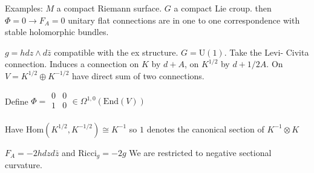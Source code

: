 Examples: 
$ M $ a compact Riemann surface. 
$ G$ a compact Lie croup. 
then $ \Phi = 0 \rightarrow F_A = 0 $ unitary flat connections are in one to one correspondence with stable holomorphic bundles. 

$ g = h dz \wedge d \bar{z} $ compatible with the ex structure. 
$ G = \mathrm{U} ( 1) $. 
Take the Levi- Civita connection. 
Induces a connection on $K$ by $ d + A $, 
on $ K^{1/2} $ by $ d + 1/2 A $. 
On $ V = K^{1/2} \oplus K^{-1/2} $ have direct sum of two connections. 

Define $ \Phi = \begin{array}{rr}
    0 & 0 \\
    1 & 0 \\
\end{array} \in \Omega ^{1,0} ( \mathrm{End} (V) ) $ 

Have $ \mathrm{Hom} ( K^{1/2} , K^{-1/2} ) \cong K ^{-1} $ so $1$ denotes the canonical section of $ K^{-1} \otimes K $ 

$F_A = - 2h dz d \bar{z} $ and $ \mathrm{Ricci}_g = -2 g $ 
We are restricted to negative sectional curvature. 













 

